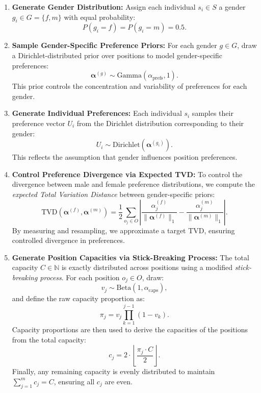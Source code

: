 \documentclass[letterpaper]{article}
\begin{document}
\begin{enumerate}
    \item \textbf{Generate Gender Distribution:}  
    Assign each individual \( s_i \in S \) a gender \( g_i \in G = \{f, m\} \) with equal probability:
    \[
    P(g_i = f) = P(g_i = m) = 0.5.
    \]

    \item \textbf{Sample Gender-Specific Preference Priors:}  
    For each gender \( g \in G \), draw a Dirichlet-distributed prior over positions to model gender-specific preferences:
    \[
    \boldsymbol{\alpha}^{(g)} \sim \text{Gamma}(\alpha_\text{prefs}, 1).
    \]
    This prior controls the concentration and variability of preferences for each gender.

    \item \textbf{Generate Individual Preferences:}  
    Each individual \( s_i \) samples their preference vector \( U_i \) from the Dirichlet distribution corresponding to their gender:
    \[
    U_i \sim \text{Dirichlet}(\boldsymbol{\alpha}^{(g_i)}).
    \]
    This reflects the assumption that gender influences position preferences.

    \item \textbf{Control Preference Divergence via Expected TVD:}  
    To control the divergence between male and female preference distributions, we compute the \textit{expected Total Variation Distance} between gender-specific priors:
    \[
    \text{TVD}(\boldsymbol{\alpha}^{(f)}, \boldsymbol{\alpha}^{(m)}) = \frac{1}{2} \sum_{o_j \in O} \left| \frac{\alpha^{(f)}_j}{{\|\boldsymbol{\alpha}^{(f)}\|_1}} - \frac{\alpha^{(m)}_j}{\|\boldsymbol{\alpha}^{(m)}\|_1} \right|.
    \]
    By measuring and resampling, we approximate a target TVD, ensuring controlled divergence in preferences.

    \item \textbf{Generate Position Capacities via Stick-Breaking Process:}  
    The total capacity \( C \in \mathbb{N}\) is exactly distributed across positions using a modified \textit{stick-breaking process}. For each position \( o_j \in O \), draw:
    \[
    v_j \sim \text{Beta}(1, \alpha_\text{caps}),
    \]
    and define the raw capacity proportion as:
    \[
    \pi_j = v_j \prod_{k=1}^{j-1} (1 - v_k).
    \]
    Capacity proportions are then used to derive the capacities of the positions from the total capacity:
    \[
    c_j = 2 \cdot \left\lfloor \frac{\pi_j \cdot C}{2} \right\rfloor.
    \]
    Finally, any remaining capacity is evenly distributed to maintain \( \sum_{j=1}^m c_j = C \), ensuring all \( c_j \) are even.
\end{enumerate}
\end{document}
